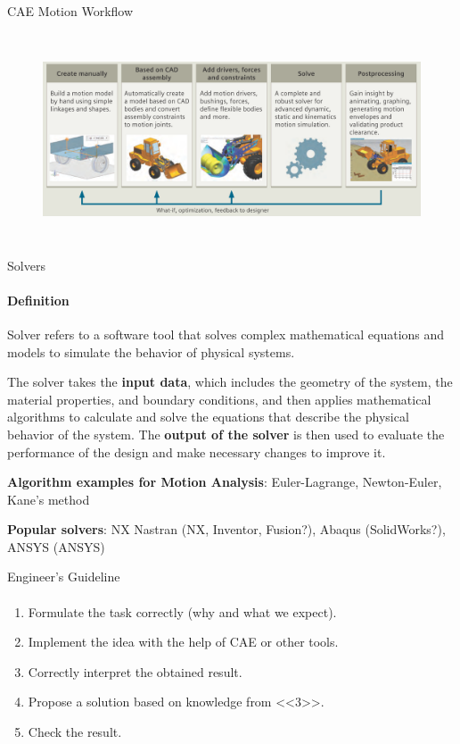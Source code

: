 \documentclass[aspectratio=169]{beamer}
\begin{document}
\begin{frame}[t]{CAE Motion Workflow}
\framesubtitle{}
    \vspace{-0.6cm}
    \begin{figure}[H]
        \centering\includegraphics[height=6cm,width=1\textwidth,keepaspectratio]{cae_motion_guideline.png}
        \label{fig:file_name}
    \end{figure}
\end{frame}

\begin{frame}[t]{Solvers}
\framesubtitle{Definition}
Solver refers to a software tool that solves complex mathematical equations and models to simulate the behavior of physical systems.
\smallskip

The solver takes the \textbf{input data}, which includes the geometry of the system, the material properties, and boundary conditions, and then applies mathematical algorithms to calculate and solve the equations that describe the physical behavior of the system. The \textbf{output of the solver} is then used to evaluate the performance of the design and make necessary changes to improve it.
\smallskip

\textbf{Algorithm examples for Motion Analysis}: Euler-Lagrange, Newton-Euler, Kane's method
\smallskip

\textbf{Popular solvers}: NX Nastran (NX, Inventor, Fusion?), Abaqus (SolidWorks?), ANSYS (ANSYS)
\end{frame}

\begin{frame}[t]{Engineer's Guideline}
\framesubtitle{}
    \begin{enumerate}
        \item Formulate the task correctly (why and what we expect).
        \item Implement the idea with the help of CAE or other tools.
        \item Correctly interpret the obtained result.
        \item Propose a solution based on knowledge from <<3>>.
        \item Check the result.
    \end{enumerate}
\end{frame}
\end{document}
